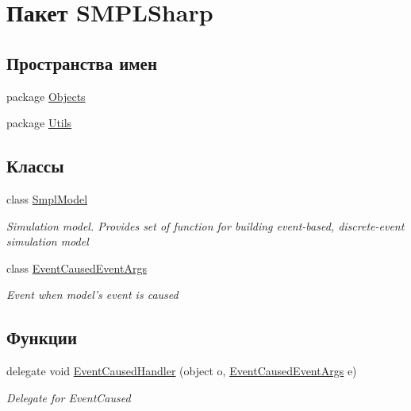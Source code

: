 \hypertarget{namespace_s_m_p_l_sharp}{\section{Пакет S\-M\-P\-L\-Sharp}
\label{dd/d3b/namespace_s_m_p_l_sharp}
}
\subsection*{Пространства имен}
\begin{DoxyCompactItemize}
\item 
package \hyperlink{namespace_s_m_p_l_sharp_1_1_objects}{Objects}
\item 
package \hyperlink{namespace_s_m_p_l_sharp_1_1_utils}{Utils}
\end{DoxyCompactItemize}
\subsection*{Классы}
\begin{DoxyCompactItemize}
\item 
class \hyperlink{class_s_m_p_l_sharp_1_1_smpl_model}{Smpl\-Model}
\begin{DoxyCompactList}\small\item\em Simulation model. Provides set of function for building event-\/based, discrete-\/event simulation model \end{DoxyCompactList}\item 
class \hyperlink{class_s_m_p_l_sharp_1_1_event_caused_event_args}{Event\-Caused\-Event\-Args}
\begin{DoxyCompactList}\small\item\em Event when model's event is caused \end{DoxyCompactList}\end{DoxyCompactItemize}
\subsection*{Функции}
\begin{DoxyCompactItemize}
\item 
delegate void \hyperlink{namespace_s_m_p_l_sharp_a33fb2904b12541599362cddd40c71357}{Event\-Caused\-Handler} (object o, \hyperlink{class_s_m_p_l_sharp_1_1_event_caused_event_args}{Event\-Caused\-Event\-Args} e)
\begin{DoxyCompactList}\small\item\em Delegate for Event\-Caused \end{DoxyCompactList}\end{DoxyCompactItemize}


